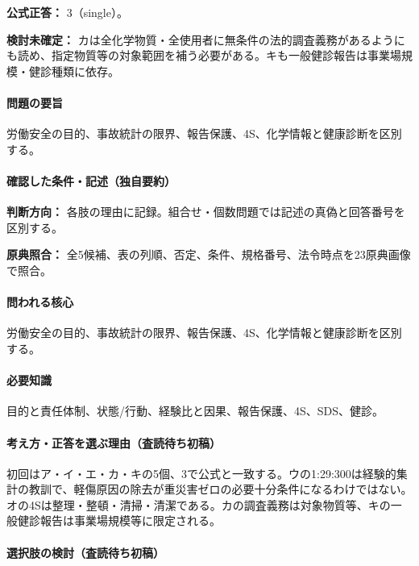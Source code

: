 \textbf{公式正答：} 3（single）。

\par\textbf{検討未確定：} カは全化学物質・全使用者に無条件の法的調査義務があるようにも読め、指定物質等の対象範囲を補う必要がある。キも一般健診報告は事業場規模・健診種類に依存。

\paragraph{問題の要旨} 労働安全の目的、事故統計の限界、報告保護、4S、化学情報と健康診断を区別する。

\paragraph{確認した条件・記述（独自要約）}\mbox{}\par

\noindent\textbf{判断方向：} 各肢の理由に記録。組合せ・個数問題では記述の真偽と回答番号を区別する。\par

\noindent\textbf{原典照合：} 全5候補、表の列順、否定、条件、規格番号、法令時点を23原典画像で照合。\par

\paragraph{問われる核心} 労働安全の目的、事故統計の限界、報告保護、4S、化学情報と健康診断を区別する。

\paragraph{必要知識} 目的と責任体制、状態/行動、経験比と因果、報告保護、4S、SDS、健診。

\paragraph{考え方・正答を選ぶ理由（査読待ち初稿）} 初回はア・イ・エ・カ・キの5個、3で公式と一致する。ウの1:29:300は経験的集計の教訓で、軽傷原因の除去が重災害ゼロの必要十分条件になるわけではない。オの4Sは整理・整頓・清掃・清潔である。カの調査義務は対象物質等、キの一般健診報告は事業場規模等に限定される。

\paragraph{選択肢の検討（査読待ち初稿）}\mbox{}\par

